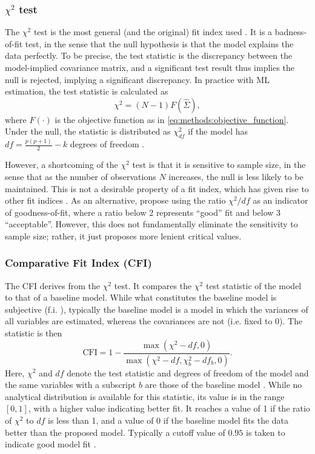 \subsubsection{$\chi^2$ test}
The $\chi^2$ test is the most general (and the original) fit index used \cite{smith2001primer}. It is a badness-of-fit
test, in the sense that the null hypothesis is that the model explains the data perfectly. To be precise,
the test statistic is the discrepancy between the model-implied covariance matrix, and a significant test result
thus implies the null is rejected, implying a significant discrepancy.
In practice with ML estimation, the test statistic is calculated as
\begin{equation}
    \label{eq:methods:chi2_test_stat}
    \chi^2 = (N - 1) F(\hat{\Sigma}),
\end{equation}
where $F(\cdot)$ is the objective function as in \cref{eq:methods:objective_function}.
Under the null, the statistic is distributed as $\chi^2_{df}$ if the model has $df = \frac{p(p + 1)}{2} - k$ degrees of freedom
\cite{zheng2025enhancing}.

However, a shortcoming of the $\chi^2$ test is that it is sensitive to sample size, in the sense that as
the number of observations $N$ increases, the null is less likely to be maintained. This is not a
desirable property of a fit index, which has given rise to other fit indices \cite{smith2001primer}.
As an alternative,  propose using the ratio $\chi^2 / df$ as an indicator of goodness-of-fit,
where a ratio below 2 represents ``good'' fit and below 3 ``acceptable''. However, this does not fundamentally eliminate
the sensitivity to sample size; rather, it just proposes more lenient critical values.

\subsubsection{Comparative Fit Index (CFI)}
The CFI derives from the $\chi^2$ test. It compares the $\chi^2$ test statistic of the model to that of a baseline model.
While what constitutes the baseline model is subjective (f.i. ), typically the baseline model is a
model in which the variances of all variables are estimated, whereas the covariances are not (i.e. fixed to 0).
The statistic is then
\begin{equation}
    \text{CFI} = 1 - \frac{\max(\chi^2 - df, 0)}{\max(\chi^2 - df, \chi^2_b - df_b, 0)}.
\end{equation}
Here, $\chi^2$ and $df$ denote the test statistic and degrees of freedom of the model and the same variables with a
subscript $b$ are those of the baseline model \cite{schermelleh2003evaluating}.
While no analytical distribution is available for this statistic, its value is in the range $[0, 1]$, with a
higher value indicating better fit. It reaches a value of 1 if the ratio of $\chi^2$ to $df$ is less than 1,
and a value of 0 if the baseline model fits the data better than the proposed model.
Typically a cutoff value of $0.95$ is taken to indicate good model fit \cite{hu1999cutoff}.

